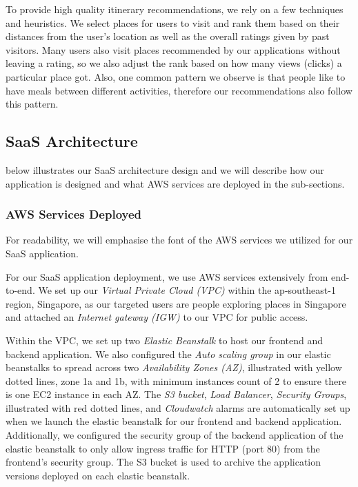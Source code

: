 \documentclass[a4paper]{article}
\begin{document}
        To provide high quality itinerary recommendations, we rely on a few techniques and heuristics. We select places for users to visit and rank them based on their distances from the user’s location as well as the overall ratings given by past visitors. Many users also visit places recommended by our applications without leaving a rating, so we also adjust the rank based on how many views (clicks) a particular place got. Also, one common pattern we observe is that people like to have meals between different activities, therefore our recommendations also follow this pattern.

    \subsection{SaaS Architecture}
     below illustrates our SaaS architecture design and we will describe how our application is designed and what AWS services are deployed in the sub-sections.
    
    
        \label{section-aws-services-deployed}
        \subsubsection{AWS Services Deployed}
        
        For readability, we will emphasise the font of the AWS services we utilized for our SaaS application.

        For our SaaS application deployment, we use AWS services extensively from end-to-end. We set up our \emph{Virtual Private Cloud (VPC)} within the ap-southeast-1 region, Singapore, as our targeted users are people exploring places in Singapore and attached an \emph{Internet gateway (IGW)} to our VPC for public access.
        
        Within the VPC, we set up two \emph{Elastic Beanstalk} to host our frontend and backend application. We also configured the \emph{Auto scaling group} in our elastic beanstalks to spread across two \emph{Availability Zones (AZ)}, illustrated with yellow dotted lines, zone 1a and 1b, with minimum instances count of 2 to ensure there is one EC2 instance in each AZ. The \emph{S3 bucket}, \emph{Load Balancer}, \emph{Security Groups}, illustrated with red dotted lines, and \emph{Cloudwatch} alarms are automatically set up when we launch the elastic beanstalk for our frontend and backend application. Additionally, we configured the security group of the backend application of the elastic beanstalk to only allow ingress traffic for HTTP (port 80) from the frontend’s security group. The S3 bucket is used to archive the application versions deployed on each elastic beanstalk.
        
\end{document}
